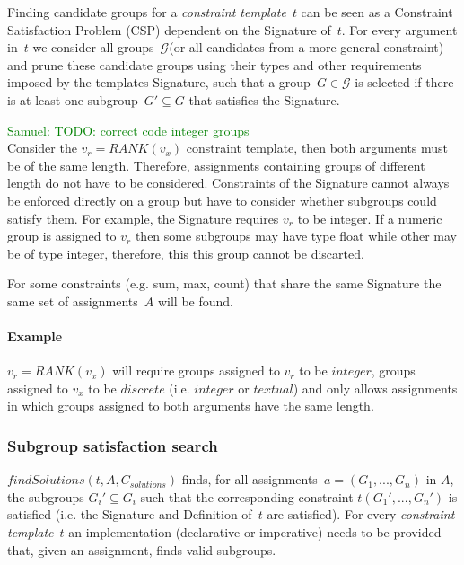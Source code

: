 \documentclass{ecai}
\newcommand{\samuel}[1]{\textcolor{green}{{\sc Samuel:} #1}\xspace}
\newcommand{\format}[1]{\textit{#1}\xspace}
\newcommand{\findassignment}{\format{findSolutions}}
\newcommand{\template}{\format{constraint template}}
\newcommand{\CSignature}{Signature\xspace}
\newcommand{\CFunction}{Definition\xspace}
\newcommand{\groups}{\ensuremath{\mathcal{G}}\xspace}
\newcommand{\eccalc}[2]{\ensuremath{#1 = #2}}
\newcommand{\ecrank}[2]{\eccalc{#1}{\mathit{RANK}(#2)}}
\newcommand{\textual}{\format{textual}}
\newcommand{\integer}{\format{integer}}
\newcommand{\discrete}{\format{discrete}}
\begin{document}
Finding candidate groups for a \template~$t$ can be seen as a Constraint Satisfaction Problem (CSP) dependent on the \CSignature of~$t$.
For every argument in~$t$ we consider all groups~\groups (or all candidates from a more general constraint) and prune these candidate groups using their types and other requirements imposed by the templates \CSignature, such that a group~$G \in \groups$ is selected if there is at least one subgroup~$G' \subseteq G$ that satisfies the \CSignature.

\samuel{TODO: correct code integer groups}\\
Consider the \ecrank{v_r}{v_x} constraint template, then both arguments must be of the same length.
Therefore, assignments containing groups of different length do not have to be considered.
Constraints of the \CSignature cannot always be enforced directly on a group but have to consider whether subgroups could satisfy them.
For example, the \CSignature requires $v_r$ to be integer.
If a numeric group is assigned to $v_r$ then some subgroups may have type float while other may be of type integer, therefore, this this group cannot be discarted.

For some constraints (e.g. sum, max, count) that share the same \CSignature the same set of assignments~$A$ will be found.

\paragraph{Example}
\ecrank{v_r}{v_x} will require groups assigned to $v_r$ to be $\integer$, groups assigned to $v_x$ to be $\discrete$ (i.e. $\integer$ or $\textual$) and only allows assignments in which groups assigned to both arguments have the same length.

\subsubsection{Subgroup satisfaction search}
$\findassignment(t,A,C_{solutions})$ finds, for all assignments~$a = (G_1, ..., G_n)$ in $A$, the subgroups $G_i' \subseteq G_i$ such that the corresponding constraint $t(G_1', ..., G_n')$ is satisfied (i.e. the \CSignature and \CFunction of~$t$ are satisfied).
For every \template~$t$ an implementation (declarative or imperative) needs to be provided that, given an assignment, finds valid subgroups.
\end{document}
